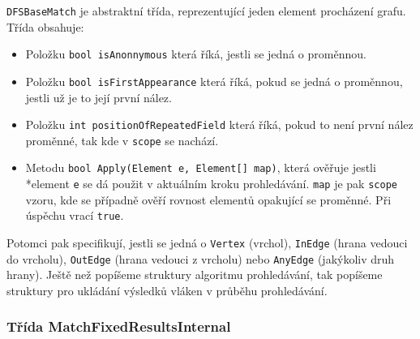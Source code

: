 \texttt{DFSBaseMatch} je abstraktní třída, reprezentující jeden element procházení grafu.
Třída obsahuje:
\begin{itemize}
\item Položku \texttt{bool isAnonnymous} která říká, jestli se jedná o proměnnou.
\item Položku \texttt{bool isFirstAppearance} která říká, pokud se jedná o proměnnou, jestli už je to její první nález.
\item Položku \texttt{int positionOfRepeatedField} která říká, pokud to není první nález proměnné, tak kde v \texttt{scope} se nachází. 
\item Metodu \texttt{bool Apply(Element e, Element[] map)}, která ověřuje jestli \\*element \texttt{e} se dá použit v aktuálním kroku prohledávání.
\texttt{map} je pak \texttt{scope} vzoru, kde se případně ověří rovnost elementů opakující se proměnné. Při úspěchu vrací \texttt{true}.
\end{itemize}
Potomci pak specifikují, jestli se jedná o \texttt{Vertex} (vrchol), \texttt{InEdge} (hrana vedouci do vrcholu), \texttt{OutEdge} (hrana vedouci z vrcholu) nebo \texttt{AnyEdge} (jakýkoliv druh hrany).
Ještě než popíšeme struktury algoritmu prohledávání, tak popíšeme struktury pro ukládání výsledků vláken v průběhu prohledávání.

\subsubsection{Třída MatchFixedResultsInternal}

